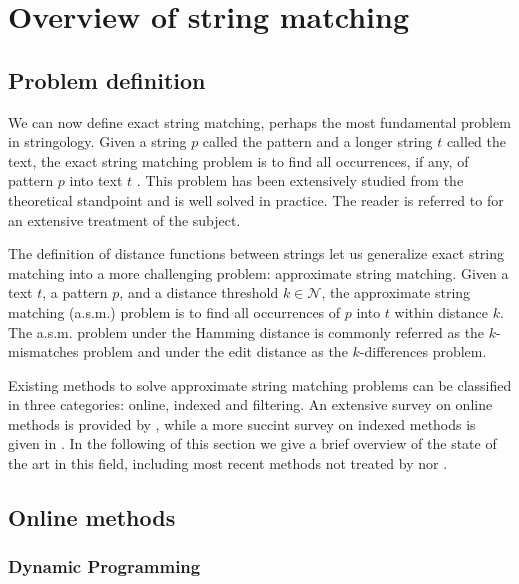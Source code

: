 \section{Overview of string matching}

\subsection{Problem definition}

We can now define exact string matching, perhaps the most fundamental problem in stringology.
Given a string $p$ called the pattern and a longer string $t$ called the text, the exact string matching problem is to find all occurrences, if any, of pattern $p$ into text $t$ \cite{Gusfield1997}.
This problem has been extensively studied from the theoretical standpoint and is well solved in practice. The reader is referred to \cite{?} for an extensive treatment of the subject.

The definition of distance functions between strings let us generalize exact string matching into a more challenging problem: approximate string matching.
Given a text $t$, a pattern $p$, and a distance threshold $k \in \mathcal{N}$, the approximate string matching (a.s.m.) problem is to find all occurrences of $p$ into $t$ within distance $k$.
The a.s.m. problem under the Hamming distance is commonly referred as the $k$-mismatches problem and under the edit distance as the $k$-differences problem.

Existing methods to solve approximate string matching problems can be classified in three categories: online, indexed and filtering.
An extensive survey on online methods is provided by \cite{Navarro1999}, while a more succint survey on indexed methods is given in \cite{Navarro2001}.
In the following of this section we give a brief overview of the state of the art in this field, including most recent methods not treated by \cite{Navarro1999} nor \cite{Navarro2001}.


\subsection{Online methods}

\subsubsection{Dynamic Programming}

